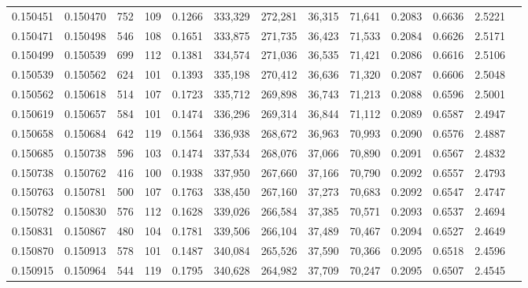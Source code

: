 \begin{tabular}{rrrrrrrrrrrrr}
0.150451 & 0.150470 &   752 & 109 &                                     0.1266 & 333,329 & 272,281 &  36,315 &  71,641 & 0.2083 & 0.6636 & 2.5221 \\
0.150471 & 0.150498 &   546 & 108 &                                     0.1651 & 333,875 & 271,735 &  36,423 &  71,533 & 0.2084 & 0.6626 & 2.5171 \\
0.150499 & 0.150539 &   699 & 112 &                                     0.1381 & 334,574 & 271,036 &  36,535 &  71,421 & 0.2086 & 0.6616 & 2.5106 \\
0.150539 & 0.150562 &   624 & 101 &                                     0.1393 & 335,198 & 270,412 &  36,636 &  71,320 & 0.2087 & 0.6606 & 2.5048 \\
0.150562 & 0.150618 &   514 & 107 &                                     0.1723 & 335,712 & 269,898 &  36,743 &  71,213 & 0.2088 & 0.6596 & 2.5001 \\
0.150619 & 0.150657 &   584 & 101 &                                     0.1474 & 336,296 & 269,314 &  36,844 &  71,112 & 0.2089 & 0.6587 & 2.4947 \\
0.150658 & 0.150684 &   642 & 119 &                                     0.1564 & 336,938 & 268,672 &  36,963 &  70,993 & 0.2090 & 0.6576 & 2.4887 \\
0.150685 & 0.150738 &   596 & 103 &                                     0.1474 & 337,534 & 268,076 &  37,066 &  70,890 & 0.2091 & 0.6567 & 2.4832 \\
0.150738 & 0.150762 &   416 & 100 &                                     0.1938 & 337,950 & 267,660 &  37,166 &  70,790 & 0.2092 & 0.6557 & 2.4793 \\
0.150763 & 0.150781 &   500 & 107 &                                     0.1763 & 338,450 & 267,160 &  37,273 &  70,683 & 0.2092 & 0.6547 & 2.4747 \\
0.150782 & 0.150830 &   576 & 112 &                                     0.1628 & 339,026 & 266,584 &  37,385 &  70,571 & 0.2093 & 0.6537 & 2.4694 \\
0.150831 & 0.150867 &   480 & 104 &                                     0.1781 & 339,506 & 266,104 &  37,489 &  70,467 & 0.2094 & 0.6527 & 2.4649 \\
0.150870 & 0.150913 &   578 & 101 &                                     0.1487 & 340,084 & 265,526 &  37,590 &  70,366 & 0.2095 & 0.6518 & 2.4596 \\
0.150915 & 0.150964 &   544 & 119 &                                     0.1795 & 340,628 & 264,982 &  37,709 &  70,247 & 0.2095 & 0.6507 & 2.4545 \\

\end{tabular}
